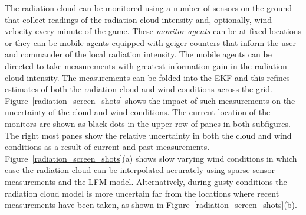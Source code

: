The radiation cloud can be monitored using a number of sensors on the ground that collect readings of the radiation cloud intensity and, optionally, wind velocity every minute of the game. These {\it monitor agents} can be at fixed locations or they can be mobile agents equipped with geiger-counters that inform the user and commander of the local radiation intensity.  The mobile agents can be directed to take measurements with greatest information gain in the radiation cloud intensity.  The measurements can be folded into the EKF and this refines estimates of both the radiation cloud and wind conditions across the grid.  Figure~\ref{radiation_screen_shots} shows the impact of such measurements on the uncertainty of the cloud and wind conditions.  The current location of the monitors are shown as black dots in the upper row of panes in both subfigures.  The right most panes show the relative uncertainty in both the cloud and wind conditions as a result of current and past measurements.  Figure~\ref{radiation_screen_shots}(a) shows slow varying wind conditions in which case the radiation cloud can be interpolated accurately using sparse sensor measurements and the LFM model.  Alternatively, during gusty conditions the radiation cloud model is more uncertain far from the locations where recent measurements have been taken, as shown in Figure~\ref{radiation_screen_shots}(b).
